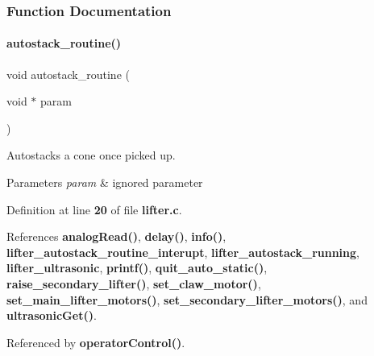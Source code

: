 \subsubsection{Function Documentation}
\mbox{\label{lifter_8c_a8a64fa88b389b39c236c5c57a7fb5c67}} 
\paragraph{autostack\+\_\+routine()}
{\footnotesize\ttfamily void autostack\+\_\+routine (\begin{DoxyParamCaption}\item[{void $\ast$}]{param }\end{DoxyParamCaption})}



Autostacks a cone once picked up. 


\begin{DoxyParams}{Parameters}
{\em param} & ignored parameter \\
\hline
\end{DoxyParams}


Definition at line \textbf{ 20} of file \textbf{ lifter.\+c}.



References \textbf{ analog\+Read()}, \textbf{ delay()}, \textbf{ info()}, \textbf{ lifter\+\_\+autostack\+\_\+routine\+\_\+interupt}, \textbf{ lifter\+\_\+autostack\+\_\+running}, \textbf{ lifter\+\_\+ultrasonic}, \textbf{ printf()}, \textbf{ quit\+\_\+auto\+\_\+static()}, \textbf{ raise\+\_\+secondary\+\_\+lifter()}, \textbf{ set\+\_\+claw\+\_\+motor()}, \textbf{ set\+\_\+main\+\_\+lifter\+\_\+motors()}, \textbf{ set\+\_\+secondary\+\_\+lifter\+\_\+motors()}, and \textbf{ ultrasonic\+Get()}.



Referenced by \textbf{ operator\+Control()}.



